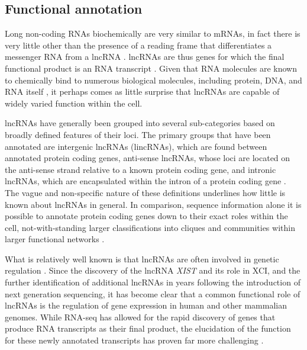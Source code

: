 

\subsection{Functional annotation}
Long non-coding RNAs biochemically are very similar to mRNAs, in fact there is very little other than the presence of a reading frame that differentiates a messenger RNA from a lncRNA \cite{Amaral2008TheMachine}. lncRNAs are thus genes for which the final functional product is an RNA transcript \cite{Ponting2009EvolutionRNAs}. Given that RNA molecules are known to chemically bind to numerous biological molecules, including protein, DNA, and RNA itself \cite{Chu2015SystematicProteins,Hacisuleyman2016FunctionLocus,Schertzer2019LncRNA-InducedDNA}, it perhaps comes as little surprise that lncRNAs are capable of widely varied function within the cell. 

lncRNAs have generally been grouped into several sub-categories based on broadly defined features of their loci. The primary groups that have been annotated are intergenic lncRNAs (lincRNAs), which are found between annotated protein coding genes, anti-sense lncRNAs, whose loci are located on the anti-sense strand relative to a known protein coding gene, and intronic lncRNAs, which are encapsulated within the intron of a protein coding gene \cite{Rinn2012GenomeRNAs}. The vague and non-specific nature of these definitions underlines how little is known about lncRNAs in general. In comparison, sequence information alone it is possible to annotate protein coding genes down to their exact roles within the cell, not-with-standing larger classifications into cliques and communities within larger functional networks \cite{Loewenstein2009ProteinInference.}. 

What is relatively well known is that lncRNAs are often involved in genetic regulation \cite{Kirk2018FunctionalContent,Schertzer2019LncRNA-InducedDNA,Hacisuleyman2016FunctionLocus,Rinn2012GenomeRNAs}. Since the discovery of the lncRNA \emph{XIST} and its role in XCI, and the further identification of additional lncRNAs in years following the introduction of next generation sequencing, it has become clear that a common functional role of lncRNAs is the regulation of gene expression in human and other mammalian genomes. While RNA-seq has allowed for the rapid discovery of genes that produce RNA transcripts as their final product, the elucidation of the function for these newly annotated transcripts has proven far more challenging \cite{Kirk2018FunctionalContent,Rinn2012GenomeRNAs}. 

